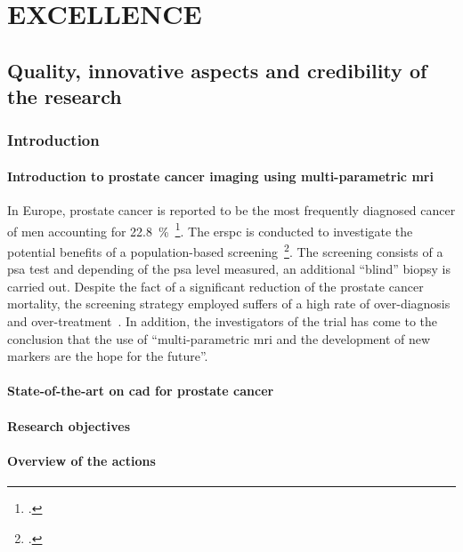 \section{EXCELLENCE}
\label{sec:excellence}

\subsection{Quality, innovative aspects and credibility of the research}
\label{sec:quality}

\subsubsection{Introduction}

\paragraph{Introduction to prostate cancer imaging using multi-parametric \ac{mri}}

In Europe, prostate cancer is reported to be the most frequently diagnosed cancer of men accounting for 22.8~\%~\footcite{Ferlay2013}. 
The \ac{erspc} is conducted to investigate the potential benefits of a population-based screening~\footcite{Schroder2015}. 
The screening consists of a \ac{psa} test and depending of the \ac{psa} level measured, an additional ``blind'' biopsy is carried out. 
Despite the fact of a significant reduction of the prostate cancer mortality, the screening strategy employed suffers of a high rate of over-diagnosis and over-treatment~\cite{Delpierre2013,Schroder2015}.
In addition, the investigators of the trial has come to the conclusion that the use of ``multi-parametric \ac{mri} and the development of new markers are the hope for the future''.

\paragraph{State-of-the-art on \ac{cad} for prostate cancer}

\paragraph{Research objectives}

\paragraph{Overview of the actions}

